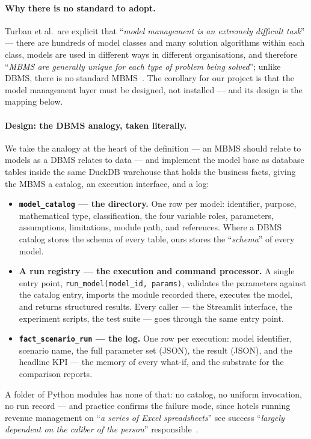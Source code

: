 \paragraph{Why there is no standard to adopt.}
Turban et al.\ are explicit that ``\emph{model management is an extremely difficult task}'' --- there are hundreds of model classes and many solution algorithms within each class, models are used in different ways in different organisations, and therefore ``\emph{MBMS are generally unique for each type of problem being solved}''; unlike DBMS, there is no standard MBMS~\cite{turban2011}. The corollary for our project is that the model management layer must be designed, not installed --- and its design is the mapping below.

\paragraph{Design: the DBMS analogy, taken literally.}
We take the analogy at the heart of the definition --- an MBMS should relate to models as a DBMS relates to data --- and implement the model base as database tables inside the same DuckDB warehouse that holds the business facts, giving the MBMS a catalog, an execution interface, and a log:

\begin{itemize}
  \item \textbf{\texttt{model\_catalog} --- the directory.} One row per model: identifier, purpose, mathematical type, classification, the four variable roles, parameters, assumptions, limitations, module path, and references. Where a DBMS catalog stores the schema of every table, ours stores the ``\emph{schema}'' of every model.
  \item \textbf{A run registry --- the execution and command processor.} A single entry point, \texttt{run\_model(model\_id, params)}, validates the parameters against the catalog entry, imports the module recorded there, executes the model, and returns structured results. Every caller --- the Streamlit interface, the experiment scripts, the test suite --- goes through the same entry point.
  \item \textbf{\texttt{fact\_scenario\_run} --- the log.} One row per execution: model identifier, scenario name, the full parameter set (JSON), the result (JSON), and the headline KPI --- the memory of every what-if, and the substrate for the comparison reports.
\end{itemize}

A folder of Python modules has none of that: no catalog, no uniform invocation, no run record --- and practice confirms the failure mode, since hotels running revenue management on ``\emph{a series of Excel spreadsheets}'' see success ``\emph{largely dependent on the caliber of the person}'' responsible~\cite{anderson2012}.


